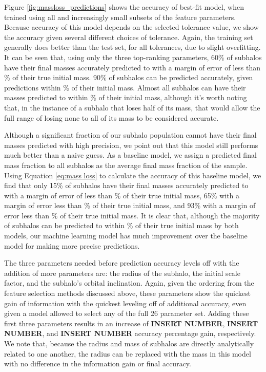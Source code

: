 \documentclass[fleqn,usenatbib]{mnras}
\newcommand\edits[1]{{\color{red}#1}}
\begin{document}
Figure \ref{fig:massloss_predictions} shows the accuracy of best-fit model, when trained using all and increasingly small subsets of the feature parameters. Because accuracy of this model depends on the selected tolerance value, we show the accuracy given several different choices of tolerance. Again, the training set generally does better than the test set, for all tolerances, due to slight  overfitting. It can be seen that, using only the three top-ranking parameters, 60\% of subhalos have their final masses accurately predicted to with a margin of error of less than \% of their true initial mass. 90\% of subhalos can be predicted accurately, given predictions within \% of their initial mass. Almost all subhalos can have their masses predicted to within \% of their initial mass, although it's worth noting that, in the instance of a subhalo that loses half of its mass, that would allow the full range of losing none to all of its mass to be considered accurate. 

Although a significant fraction of our subhalo population cannot have their final masses predicted with high precision, we point out that this model still performs much better than a naive guess. As a baseline model, we assign a predicted final mass fraction to all subhalos as the average final mass fraction of the sample. Using Equation \ref{eq:mass loss} to calculate the accuracy of this baseline model, we find that only 15\% of subhalos have their final masses accurately predicted to with a margin of error of less than \% of their true initial mass, 65\% with a margin of error less than \% of their true initial mass, and 93\% with a margin of error less than \% of their true initial mass. It is clear that, although the majority of subhalos can be predicted to within \% of their true initial mass by both models, our machine learning model has much improvement over the baseline model for making more precise predictions.

The three parameters needed before prediction accuracy levels off with the addition of more parameters are: the radius of the subhalo, the initial scale factor, and the subhalo's orbital inclination. Again, given the ordering from the feature selection methods discussed above, these parameters show the quickest gain of information with the quickest leveling off of additional accuracy, even given a model allowed to select any of the full 26 parameter set. Adding these first three parameters results in an increase of \edits{\textbf{INSERT NUMBER}}, \edits{\textbf{INSERT NUMBER}}, and  \edits{\textbf{INSERT NUMBER}} accuracy percentage gain, respectively. We note that, because the radius and mass of subhalos are directly analytically related to one another, the radius can be replaced with the mass in this model with no difference in the information gain or final accuracy.
\end{document}
